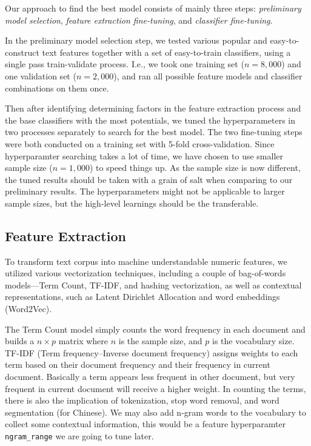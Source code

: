\documentclass[compsoc]{IEEEtran}
\begin{document}
Our approach to find the best model consists of mainly three steps: \textit{preliminary model selection}, \textit{feature extraction fine-tuning}, and \textit{classifier fine-tuning}.

In the preliminary model selection step, we tested various popular and easy-to-construct text features together with a set of easy-to-train classifiers, using a single pass train-validate process. I.e., we took one training set ($n=8,000$) and one validation set ($n=2,000$), and ran all possible feature models and classifier combinations on them once.

Then after identifying determining factors in the feature extraction process and the base classifiers with the most potentials, we tuned the hyperparameters in two processes separately to search for the best model. The two fine-tuning steps were both conducted on a training set with 5-fold cross-validation. Since hyperparamter searching takes a lot of time, we have chosen to use smaller sample size ($n=1,000$) to speed things up. As the sample size is now different, the tuned results should be taken with a grain of salt when comparing to our preliminary results. The hyperparameters might not be applicable to larger sample sizes, but the high-level learnings should be the transferable.

\subsection{Feature Extraction}

To transform text corpus into machine understandable numeric features, we utilized various vectorization techniques, including a couple of bag-of-words models---Term Count, TF-IDF, and hashing vectorization, as well as contextual representations, such as Latent Dirichlet Allocation and word embeddings (Word2Vec).

The Term Count model simply counts the word frequency in each document and builds a $n\times p$ matrix where $n$ is the sample size, and $p$ is the vocabulary size. TF-IDF (Term frequency–Inverse document frequency) assigns weights to each term based on their document frequency and their frequency in current document. Basically a term appears less frequent in other document, but very frequent in current document will receive a higher weight. In counting the terms, there is also the implication of tokenization, stop word removal, and word segmentation (for Chinese). We may also add n-gram words to the vocabulary to collect some contextual information, this would be a feature hyperparamter \texttt{ngram\_range} we are going to tune later.
\end{document}

